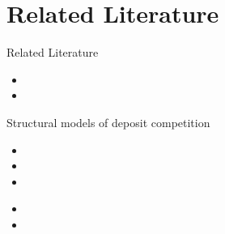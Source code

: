 \documentclass[notes,11pt, aspectratio=169]{beamer}
\newenvironment{wideitemize}{\itemize\addtolength{\itemsep}{10pt}}{\enditemize}
\begin{document}
\section{Related Literature}
\begin{frame}[label = lit]{Related Literature}

  \begin{wideitemize}
      \item 
      
      \begin{itemize}
        \item 
        \item 
      \end{itemize}


          \item Structural models of deposit competition

          \begin{itemize}
            \item 
            \item 
            \item 
          \end{itemize}
      
      \item 
      
      \begin{itemize}
          \item 
          \item 
      \end{itemize}

  \end{wideitemize}
  
\end{frame}






    
    
\end{document}
